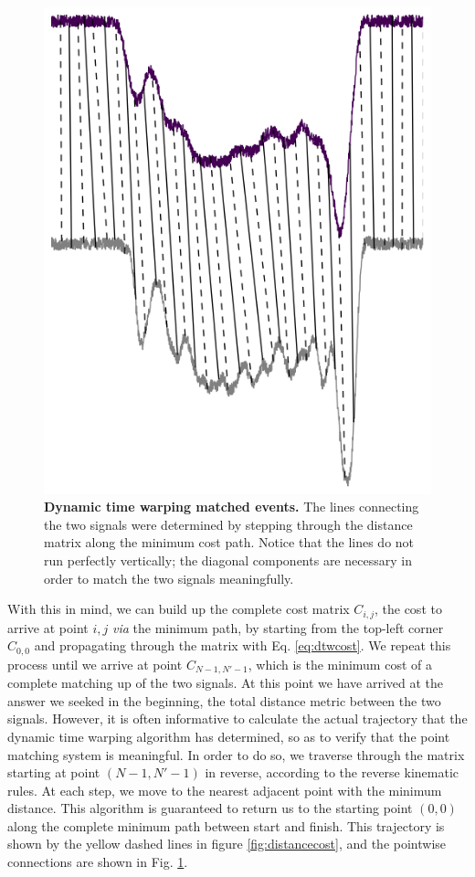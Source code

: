 			
			\begin{figure}
				\includegraphics[width=.5\textwidth]{dtw_matching.png}
				\caption{\textbf{Dynamic time warping matched events.} The lines connecting the two signals were determined by stepping through the distance matrix along the minimum cost path. Notice that the lines do not run perfectly vertically; the diagonal components are necessary in order to match the two signals meaningfully.}
				\label{fig:dtw_matching}
			\end{figure}

			
			With this in mind, we can build up the complete cost matrix $C_{i,j}$, the cost to arrive at point $i,j$ \textit{via} the minimum path, by starting from the top-left corner $C_{0,0}$ and propagating through the matrix with Eq. \ref{eq:dtwcost}. We repeat this process until we arrive at point $C_{N-1,N'-1}$, which is the minimum cost of a complete matching up of the two signals. At this point we have arrived at the answer we seeked in the beginning, the total distance metric between the two signals. However, it is often informative to calculate the actual trajectory that the dynamic time warping algorithm has determined, so as to verify that the point matching system is meaningful. In order to do so, we traverse through the matrix starting at point $\left(N-1,N'-1\right)$ in reverse, according to the reverse kinematic rules. At each step, we move to the nearest adjacent point with the minimum distance. This algorithm is guaranteed to return us to the starting point $\left(0,0\right)$ along the complete minimum path between start and finish. This trajectory is shown by the yellow dashed lines in figure \ref{fig:distancecost}, and the pointwise connections are shown in Fig. \ref{fig:dtw_matching}.
		
